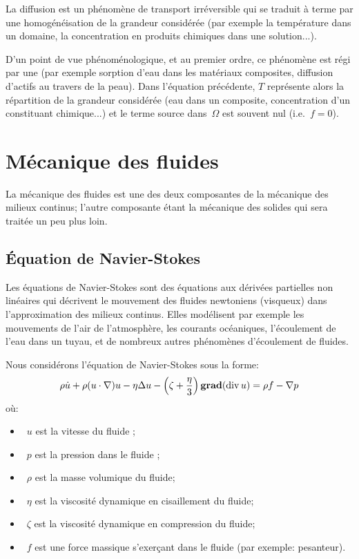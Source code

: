 La diffusion est un phénomène de transport irréversible qui se traduit à terme par une homogénéisation de la grandeur considérée (par exemple la température dans un domaine, la concentration en produits chimiques dans une solution...).

D'un point de vue phénoménologique, et au premier ordre, ce phénomène est régi par une  (par exemple sorption d'eau dans les matériaux composites, diffusion d'actifs au travers de la peau). Dans l'équation précédente, $T$ représente alors la répartition de la grandeur considérée (eau dans un composite, concentration d'un constituant chimique...) et le terme source dans~$\Omega$ est souvent nul (i.e.~$f=0$).





\medskip
\section{Mécanique des fluides}
La mécanique des fluides est une des deux composantes de la mécanique des milieux continus; l'autre composante étant la mécanique des solides qui sera traitée un peu plus loin.





\medskip
\subsection{Équation de Navier-Stokes}
Les équations de Navier-Stokes sont des équations aux dérivées partielles non linéaires qui décrivent le mouvement des fluides newtoniens (visqueux) dans l'approximation des milieux continus. Elles modélisent par exemple les mouvements de l'air de l'atmosphère, les courants océaniques, l'écoulement de l'eau dans un tuyau, et de nombreux autres phénomènes d'écoulement de fluides.

\medskip
Nous considérons l'équation de Navier-Stokes sous la forme:
\begin{equation}
\rho \dot{u} + \rho (u\cdot\nabla)u - \eta \Delta u
- \left( \zeta + \frac{\eta}{3} \right) \operatorname{\mathbf{grad}} (\operatorname{div} u)
= \rho f - \nabla p
\end{equation}
où:
\begin{itemize}
  \item~$u$ est la vitesse du fluide ;
  \item~$p$ est la pression dans le fluide ;
  \item~$\rho$ est la masse volumique du fluide;
  \item~$\eta$ est la viscosité dynamique en cisaillement du fluide;
  \item~$\zeta$ est la viscosité dynamique en compression du fluide;
  \item~$f$ est une force massique s'exerçant dans le fluide (par exemple: pesanteur).
\end{itemize}

